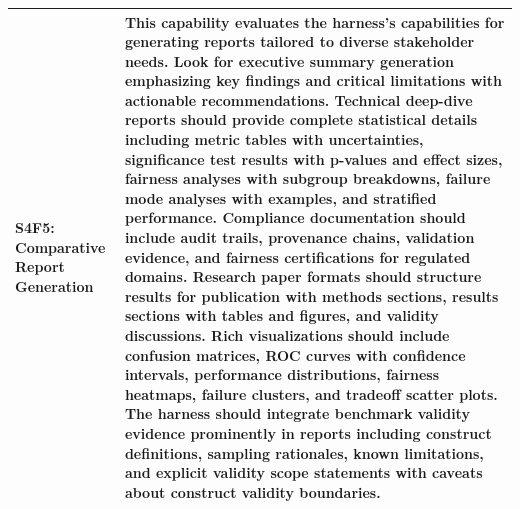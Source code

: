 \begin{longtable}{>{\raggedright\arraybackslash}p{3cm}|>{\raggedright\arraybackslash}p{16cm}}
S4F5: Comparative Report Generation & This capability evaluates the harness's capabilities for generating reports tailored to diverse stakeholder needs. Look for executive summary generation emphasizing key findings and critical limitations with actionable recommendations. Technical deep-dive reports should provide complete statistical details including metric tables with uncertainties, significance test results with p-values and effect sizes, fairness analyses with subgroup breakdowns, failure mode analyses with examples, and stratified performance. Compliance documentation should include audit trails, provenance chains, validation evidence, and fairness certifications for regulated domains. Research paper formats should structure results for publication with methods sections, results sections with tables and figures, and validity discussions. Rich visualizations should include confusion matrices, ROC curves with confidence intervals, performance distributions, fairness heatmaps, failure clusters, and tradeoff scatter plots. The harness should integrate benchmark validity evidence prominently in reports including construct definitions, sampling rationales, known limitations, and explicit validity scope statements with caveats about construct validity boundaries. \\
\hline


\end{longtable}
